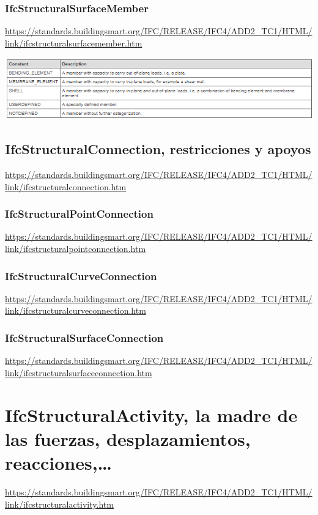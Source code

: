 \documentclass[spanish,12pt,a4paper,final,oneside]{book}
\begin{document}
\subsubsection{IfcStructuralSurfaceMember}
\url{https://standards.buildingsmart.org/IFC/RELEASE/IFC4/ADD2_TC1/HTML/link/ifcstructuralsurfacemember.htm}

\includegraphics[width=\textwidth]{Definicion de IfcStructuralSurfaceMemberTypeEnum}


\subsection{IfcStructuralConnection, restricciones y apoyos}
\url{https://standards.buildingsmart.org/IFC/RELEASE/IFC4/ADD2_TC1/HTML/link/ifcstructuralconnection.htm}

\subsubsection{IfcStructuralPointConnection}
\url{https://standards.buildingsmart.org/IFC/RELEASE/IFC4/ADD2_TC1/HTML/link/ifcstructuralpointconnection.htm}

\subsubsection{IfcStructuralCurveConnection}
\url{https://standards.buildingsmart.org/IFC/RELEASE/IFC4/ADD2_TC1/HTML/link/ifcstructuralcurveconnection.htm}

\subsubsection{IfcStructuralSurfaceConnection}
\url{https://standards.buildingsmart.org/IFC/RELEASE/IFC4/ADD2_TC1/HTML/link/ifcstructuralsurfaceconnection.htm}


\section{IfcStructuralActivity, la madre de las fuerzas, desplazamientos, reacciones,\ldots}
\url{https://standards.buildingsmart.org/IFC/RELEASE/IFC4/ADD2_TC1/HTML/link/ifcstructuralactivity.htm}
\end{document}

